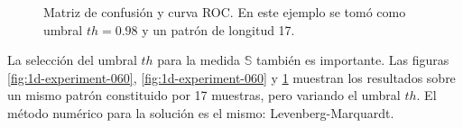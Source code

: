 \begin{figure}
	\centering
	\caption{Matriz de confusión y curva ROC. En este ejemplo se tomó como umbral $th=0.98$ y un patrón de longitud 17.} \label{fig:1d-experiment-098}
\end{figure}

La selección del umbral $th$ para la medida $\mathbb{S}$ también es importante.
Las figuras \ref{fig:1d-experiment-060}, \ref{fig:1d-experiment-060} y \ref{fig:1d-experiment-098} muestran los resultados 
sobre un mismo patrón constituido por 17 muestras, pero variando el umbral $th$. El método numérico para la solución es el
mismo: Levenberg-Marquardt.

